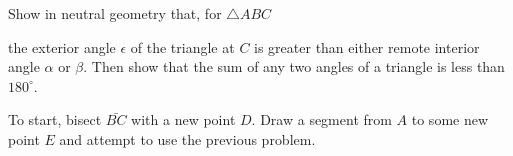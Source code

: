 \documentclass[noauthor,nooutcomes,12pt,hints,newpage,handout]{ximera}
\begin{document}
\begin{problem}
  Show in neutral geometry that, for $\triangle ABC$
\begin{image}
\end{image}
the exterior angle $\epsilon$ of the triangle at $C$ is greater than
either remote interior angle $\alpha$ or $\beta$. Then show that the
sum of any two angles of a triangle is less than $180^{\circ}$.


\begin{hint}
To start, bisect $\bar{BC}$ with a new point $D$. Draw a segment from
$A$ to some new point $E$ and attempt to use the previous problem.
\end{hint}



\end{problem}
\end{document}
